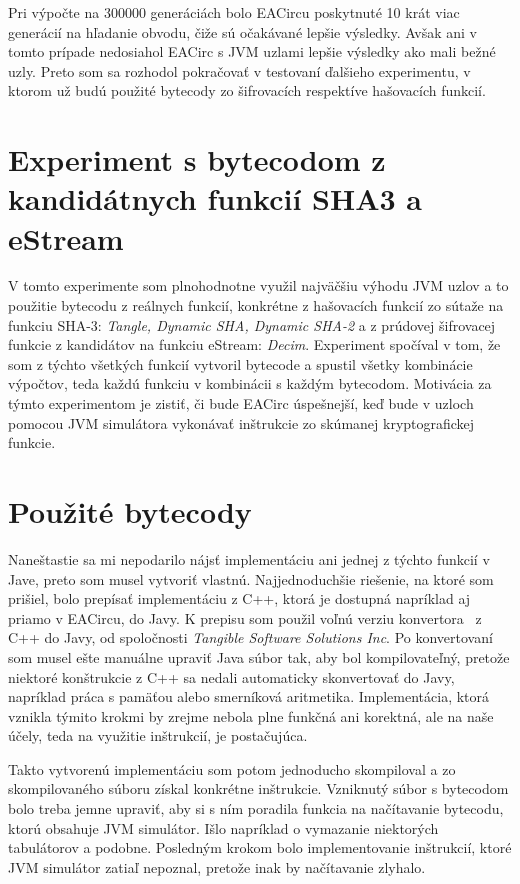Pri výpočte na 300000 generáciách bolo EACircu poskytnuté 10 krát viac generácií na hľadanie obvodu, čiže sú očakávané lepšie výsledky. Avšak ani v tomto prípade nedosiahol EACirc s JVM uzlami lepšie výsledky ako mali bežné uzly. Preto som sa rozhodol pokračovať v testovaní ďalšieho experimentu, v ktorom už budú použité bytecody zo šifrovacích respektíve hašovacích funkcií.

\section{Experiment s bytecodom z kandidátnych funkcií SHA3 a eStream}
\label{sec:exp2}

V tomto experimente som plnohodnotne využil najväčšiu výhodu JVM uzlov a to použitie bytecodu z reálnych funkcií, konkrétne z hašovacích funkcií zo sútaže na funkciu SHA-3: \textit{Tangle, Dynamic SHA, Dynamic SHA-2} a z prúdovej šifrovacej funkcie z kandidátov na funkciu eStream: \textit{Decim}. Experiment spočíval v tom, že som z týchto všetkých funkcií vytvoril bytecode a spustil všetky kombinácie výpočtov, teda každú funkciu v kombinácii s každým bytecodom. Motivácia za týmto experimentom je zistiť, či bude EACirc úspešnejší, keď bude v uzloch pomocou JVM simulátora vykonávať inštrukcie zo skúmanej kryptografickej funkcie. 

\section{Použité bytecody}
\label{sec:exp2-bytecode}

Naneštastie sa mi nepodarilo nájsť implementáciu ani jednej z týchto funkcií v Jave, preto som musel vytvoriť vlastnú. Najjednoduchšie riešenie, na ktoré som prišiel, bolo prepísať implementáciu z C++, ktorá je dostupná napríklad aj priamo v EACircu, do Javy. K prepisu som použil voľnú verziu konvertora~\parencite{c++-java-converter} z C++ do Javy, od spoločnosti \textit{Tangible Software Solutions Inc}. Po konvertovaní som musel ešte manuálne upraviť Java súbor tak, aby bol kompilovateľný, pretože niektoré konštrukcie z C++ sa nedali automaticky skonvertovať do Javy, napríklad práca s pamäťou alebo smerníková aritmetika. Implementácia, ktorá vznikla týmito krokmi by zrejme nebola plne funkčná ani korektná, ale na naše účely, teda na využitie inštrukcií, je postačujúca. 

Takto vytvorenú implementáciu som potom jednoducho skompiloval a zo skompilovaného súboru získal konkrétne inštrukcie. Vzniknutý súbor s bytecodom bolo treba jemne upraviť, aby si s ním poradila funkcia na načítavanie bytecodu, ktorú obsahuje JVM simulátor. Išlo napríklad o vymazanie niektorých tabulátorov a podobne. Posledným krokom bolo implementovanie inštrukcií, ktoré JVM simulátor zatiaľ nepoznal, pretože inak by načítavanie zlyhalo.

